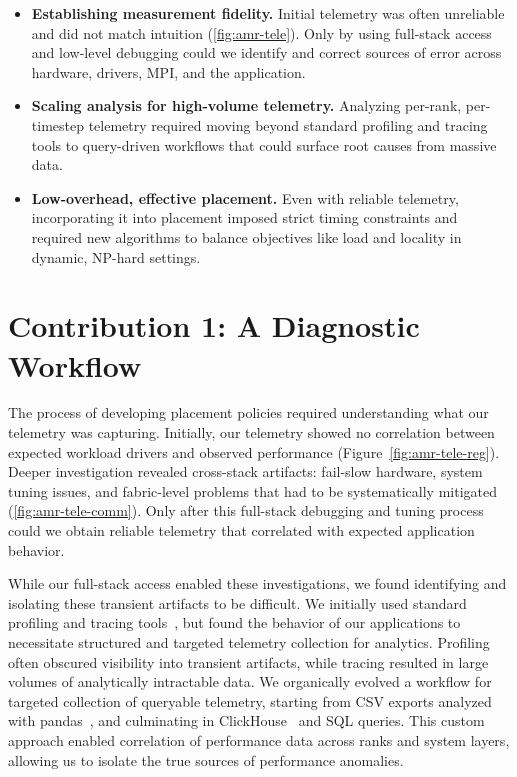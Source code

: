 \begin{itemize}
  \item \textbf{Establishing measurement fidelity.}
        Initial telemetry was often unreliable and did not match intuition (\cref{fig:amr-tele}).
        Only by using full-stack access and low-level debugging could we identify and correct sources of
        error across hardware, drivers, MPI, and the application.

  \item \textbf{Scaling analysis for high-volume telemetry.}
        Analyzing per-rank, per-timestep telemetry required moving beyond standard profiling and tracing
        tools to query-driven workflows that could surface root causes from massive data.

  \item \textbf{Low-overhead, effective placement.}
        Even with reliable telemetry, incorporating it into placement imposed strict timing constraints and
        required new algorithms to balance objectives like load and locality in dynamic, NP-hard settings.
\end{itemize}

\section{Contribution 1: A Diagnostic Workflow}

The process of developing placement policies required understanding what our telemetry was
capturing.
Initially, our telemetry showed no correlation between expected workload drivers and observed
performance (Figure~\ref{fig:amr-tele-reg}).
Deeper investigation revealed cross-stack artifacts: fail-slow hardware, system tuning issues, and
fabric-level problems that had to be systematically mitigated (\cref{fig:amr-tele-comm}).
Only after this full-stack debugging and tuning process could we obtain reliable telemetry that
correlated with expected application behavior.

While our full-stack access enabled these investigations, we found identifying and isolating these
transient artifacts to be difficult.
We initially used standard profiling and tracing tools~\cite{Shend2006:TAU}, but found the behavior
of our applications to necessitate structured and targeted telemetry collection for analytics.
Profiling often obscured visibility into transient artifacts, while tracing resulted in large
volumes of analytically intractable data.
We organically evolved a workflow for targeted collection of queryable telemetry, starting from CSV
exports analyzed with pandas~\cite{:Pandas}, and culminating in
ClickHouse~\cite{Schul2024:ClickHouse} and SQL queries.
This custom approach enabled correlation of performance data across ranks and system layers,
allowing us to isolate the true sources of performance anomalies.

